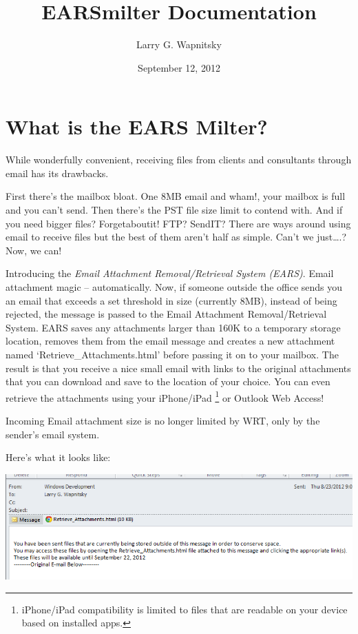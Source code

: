 \documentclass[letterpaper,10pt,english]{sphinxmanual}
\title{EARSmilter Documentation}
\date{September 12, 2012}
\author{Larry G. Wapnitsky}
\begin{document}
\maketitle
\tableofcontents
{}\label{index::doc}



\chapter{What is the EARS Milter?}
\label{about:wrt-e-mail-attachment-removal-retrieval-system-ears-milter}\label{about::doc}\label{about:what-is-the-ears-milter}
While wonderfully convenient, receiving files from clients and consultants through email has its drawbacks.

First there’s the mailbox bloat. One 8MB email and wham!, your mailbox is full and you can’t send.
Then there’s the PST file size limit to contend with.
And if you need bigger files? Forgetaboutit!
FTP? SendIT? There are ways around using email to receive files but the best of them aren’t half as simple.
Can’t we just….? Now, we can!

Introducing the \emph{Email Attachment Removal/Retrieval System (EARS)}. Email
attachment magic – automatically. Now, if someone outside the office sends you
an email that exceeds a set threshold in size (currently 8MB), instead of being
rejected, the message is passed to the Email Attachment Removal/Retrieval
System. EARS saves any attachments larger than 160K to a temporary storage
location, removes them from the email message and creates a new attachment
named ‘Retrieve\_Attachments.html’ before passing it on to your mailbox. The
result is that you receive a nice small email with links to the original
attachments that you can download and save to the location of your choice. You
can even retrieve the attachments using your iPhone/iPad \footnote{
iPhone/iPad compatibility is limited to files that are readable on your device based on installed apps.
} or Outlook Web
Access!

Incoming Email attachment size is no longer limited by WRT, only by the sender’s email system.

Here’s what it looks like:

\includegraphics{EARSmilter.png}
\end{document}
